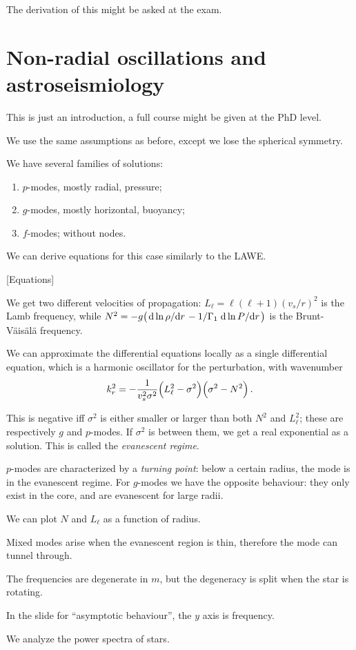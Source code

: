 \documentclass[main.tex]{subfiles}
\begin{document}
The derivation of this might be asked at the exam.


\section{Non-radial oscillations and astroseismiology}

This is just an introduction, a full course might be given at the PhD level.

We use the same assumptions as before, except we lose the spherical symmetry.

We have several families of solutions: 

\begin{enumerate}
    \item \(p\)-modes, mostly radial, pressure;
    \item \(g\)-modes, mostly horizontal, buoyancy;
    \item \(f\)-modes; without nodes.
\end{enumerate}

We can derive equations for this case similarly to the LAWE.

[Equations]

We get two different velocities of propagation: \(L_{\ell} = \ell (\ell + 1) (v_s / r)^2\) is the Lamb frequency, while \(N^2= -g \qty(\dv*{\ln \rho }{r} - 1/\Gamma_1 \dv*{\ln P }{r} )\) is the Brunt-Väisälä frequency.

We can approximate the differential equations locally as a single differential equation, which is a harmonic oscillator for the perturbation, with wavenumber
%
\begin{equation}
  k^2_r = - \frac{1}{v_s^2 \sigma^2 } \qty(L_\ell^2- \sigma^2   ) \qty(\sigma^2 - N^2)
\,.
\end{equation}

This is negative iff \(\sigma^2\) is either smaller or larger than both \(N^2\) and \(L_\ell^2\); these are respectively \(g\) and \(p\)-modes. If \(\sigma^2\) is between them, we get a real exponential as a solution.
This is called the \emph{evanescent regime}.

\(p\)-modes are characterized by a \emph{turning point}: below a certain radius, the mode is in the evanescent regime.
For \(g\)-modes we have the opposite behaviour: they only exist in the core, and are evanescent for large radii. 

We can plot \(N\) and \(L_\ell\) as a function of radius.

Mixed modes arise when the evanescent region is thin, therefore the mode can tunnel through.

The frequencies are degenerate in \(m\), but the degeneracy is split when the star is rotating.

In the slide for ``asymptotic behaviour'', the \(y\) axis is frequency.

We analyze the power spectra of stars.
\end{document}
